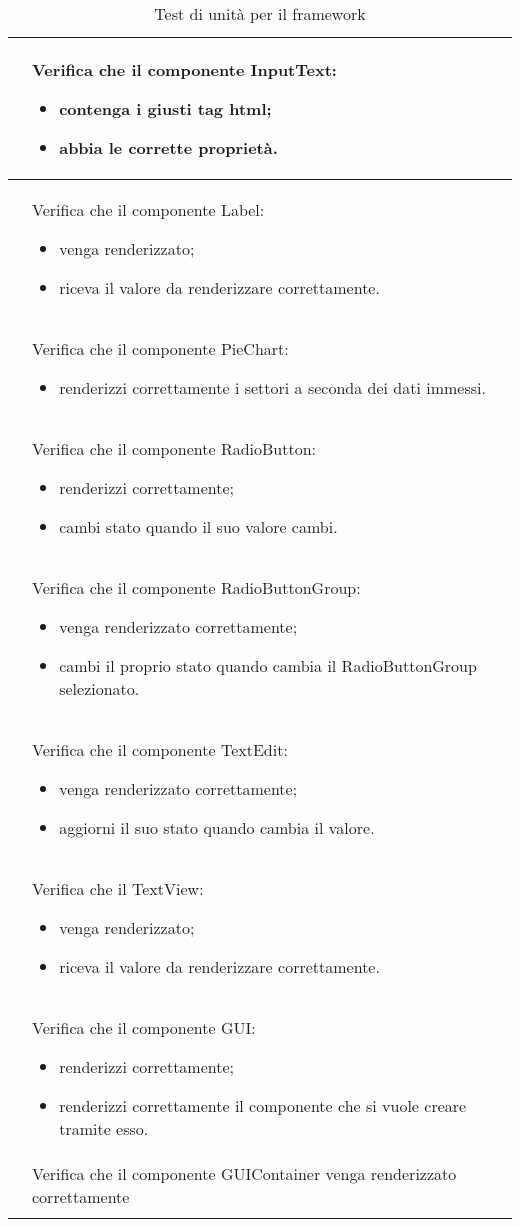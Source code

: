 \begin{longtable}{|c|P{9cm}|c|}
	\hline {} & Verifica che il componente InputText:
	\begin{itemize}
		\item contenga i giusti tag html;
		\item abbia le corrette proprietà.
	\end{itemize}
	 \\
	\hline {} & Verifica che il componente Label:
	\begin{itemize}
		\item venga renderizzato;
		\item riceva il valore da renderizzare correttamente.
	\end{itemize}
	 \\
	\hline {} & Verifica che il componente PieChart:
	\begin{itemize}
		\item renderizzi correttamente i settori a seconda dei dati immessi.
	\end{itemize}
	 \\
	\hline {} & Verifica che il componente RadioButton:
	\begin{itemize}
		\item renderizzi correttamente;
		\item cambi stato quando il suo valore cambi.
	\end{itemize}
	 \\
	\hline {} & Verifica che il componente RadioButtonGroup:
	\begin{itemize}
		\item venga renderizzato correttamente;
		\item cambi il proprio stato quando cambia il RadioButtonGroup selezionato.
	\end{itemize}
	 \\
	\hline {} & Verifica che il componente TextEdit:
	\begin{itemize}
		\item venga renderizzato correttamente;
		\item aggiorni il suo stato quando cambia il valore.
	\end{itemize}
	 \\
	\hline {}\label{tu-textview} & Verifica che il TextView:
	\begin{itemize}
		\item venga renderizzato;
		\item riceva il valore da renderizzare correttamente.
	\end{itemize}
	 \\
	\hline {} & Verifica che il componente GUI:
	\begin{itemize}
		\item renderizzi correttamente;
		\item renderizzi correttamente il componente che si vuole creare tramite esso.
	\end{itemize}
	 \\
	\hline {} & Verifica che il componente GUIContainer venga renderizzato correttamente  \\
	\hline
	\caption{Test di unità per il framework}
\end{longtable}

